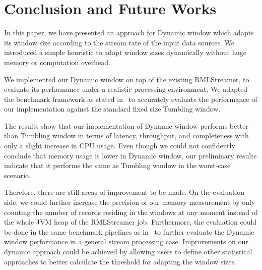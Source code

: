 \section{Conclusion and Future Works}%
\label{chap:Conclusion and Future Works}

In this paper, we have presented an approach for Dynamic window 
which adapts its window size according to the stream rate of the 
input data sources. We introduced a simple heuristic to adapt 
window sizes dynamically without huge memory or computation overhead. 

We implemented our Dynamic window on top of the existing RMLStreamer, 
to evaluate its performance under a realistic processing environment. 
We adapted the benchmark framework as stated in~\cite{evalution_of_spe} to 
accurately evaluate the performance of our implementation against the 
standard fixed size Tumbling window. 

The results show that our implementation 
of Dynamic window performs better than Tumbling window in terms of 
latency, throughput, and completeness with only a slight 
increase in CPU usage. Even though we could not confidently conclude that
memory usage is lower in Dynamic window, our preliminary results indicate 
that it performs the same as Tumbling window in the worst-case scenario.

Therefore, there are still areas of improvement to be made.
On the evaluation side, we could further increase 
the precision of our memory measurement by only counting the number of records
residing in the windows at any moment instead of the whole JVM heap of the RMLStreamer job. 
Furthermore, the evaluation could be done in the same benchmark pipelines as in~\cite{evalution_of_spe} 
to further evaluate the Dynamic window performance in a general stream processing case.
Improvements on our dynamic approach could be achieved by allowing users to 
define other statistical approaches
to better calculate the threshold for adapting the window sizes. 



